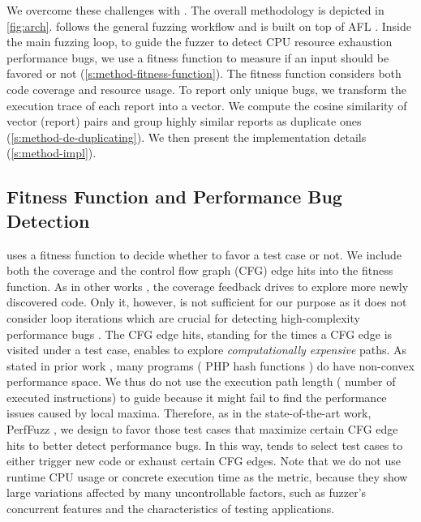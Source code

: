 We overcome these challenges with \sys.
%
The overall methodology is depicted in \autoref{fig:arch}.
%
\sys follows the general fuzzing workflow and is built on top of AFL \cite{afl}.
%
Inside the main fuzzing loop, 
%
to guide the fuzzer to detect CPU resource exhaustion performance bugs,
we use a fitness function to measure if an input should be favored or not
%
(\autoref{s:method-fitness-function}).
%
The fitness function considers both code coverage and resource usage.
%
To report only unique bugs, we transform the execution trace of each report into a vector.
%
We compute the cosine similarity of vector (report) pairs and group highly similar reports as duplicate ones (\autoref{s:method-de-duplicating}).
%
We then present the implementation details (\autoref{s:method-impl}).

\subsection{Fitness Function and Performance Bug Detection}
\label{s:method-fitness-function}
\sys uses a fitness function to decide whether to favor a test case or not.
%
%
%
We include both the coverage and the control flow graph (CFG) edge hits into the fitness function.
%
As in other works \cite{oss-fuzz, peng2018tfuzz, klees2018evaluating}, the coverage feedback drives \sys to explore more newly discovered code.
%
Only it, however, is not sufficient for our purpose as it does not consider loop iterations which are crucial for detecting high-complexity performance bugs \cite{slowfuzz}.
%
The CFG edge hits, standing for the times a CFG edge is visited under a test case, enables \sys to explore \emph{computationally expensive} paths.
%
As stated in prior work \cite{perffuzz}, many programs (\eg{,} PHP hash functions \cite{perffuzz, php-hash}) do have non-convex performance space.
%
We thus do not use the execution path length (\eg{,} number of executed instructions) to guide \sys because it might fail to find the performance issues caused by local maxima.
%
Therefore, as in the state-of-the-art work, PerfFuzz \cite{perffuzz}, we design \sys to favor those test cases that maximize certain CFG edge hits to better detect performance bugs.
%
In this way, \sys tends to select test cases to either trigger new code or exhaust certain CFG edges.
%
Note that we do not use runtime CPU usage or concrete execution time as the metric,
%
because they show large variations affected by many uncontrollable factors, such as fuzzer's concurrent features and the characteristics of testing applications.

